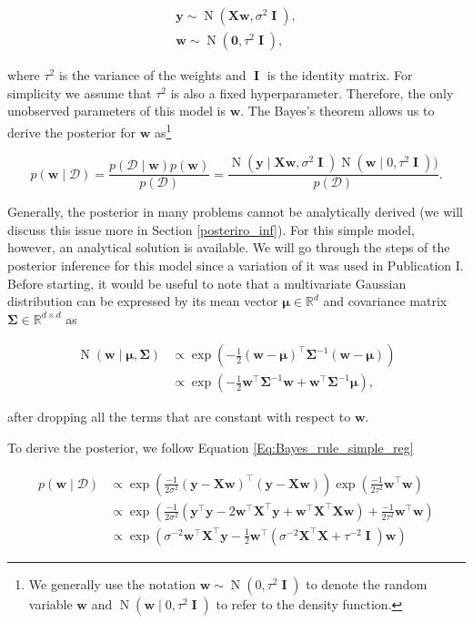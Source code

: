 \documentclass[dissertation,math,vertlayout,pdfa,colorlinks]{aaltoseries}
\newcommand{\bw}{\bm{w}}
\newcommand{\bX}{\bm{X}}
\newcommand{\by}{\bm{y}}
\newcommand{\bD}{\mathcal{D}}
\DeclareMathOperator{\eye}{\textbf{I}}
\DeclareMathOperator{\normalpdf}{N}
\newcommand{\tp}{^{\top}}
\begin{document}
\begin{align}\label{Eq:simple_Bayesian_regression} 
\by \sim \normalpdf(\bX\bw,\sigma^2 \eye),\\
\bw \sim \normalpdf(\textbf{0},\tau^2 \eye), \nonumber
\end{align}

\noindent where $\tau^2$ is the variance of the weights and $\eye$ is the identity matrix. For simplicity we assume that $\tau^2$ is also a fixed hyperparameter. Therefore, the only unobserved parameters of this model is $\bw$. The Bayes's theorem allows us to derive the posterior for $\bw$ as\footnote{We generally use the notation $\bw \sim \normalpdf(0,\tau^2 \eye)$ to denote the random variable $\bw$ and $\normalpdf(\bw\mid 0,\tau^2 \eye)$ to refer to the density function.}

\begin{equation}\label{Eq:Bayes_rule_simple_reg}
p(\bw \mid \bD) = \frac{p(\bD \mid \bw)p(\bw)}{p(\bD)} = \frac{\normalpdf(\by \mid \bX \bw,\sigma^2 \eye) \normalpdf(\bw \mid 0,\tau^2 \eye))}{p(\bD)}.
\end{equation}  

Generally, the posterior in many problems cannot be analytically derived (we will discuss this issue more in Section \ref{posteriro_inf}). For this simple model, however, an analytical solution is available. We will go through the steps of the posterior inference for this model since a variation of it was used in Publication I. Before starting, it would be useful to note that a multivariate Gaussian distribution can be expressed by its mean vector $\bm{\mu}\in \mathbb{R}^d$ and covariance matrix $\bm{\Sigma}\in \mathbb{R}^{d \times d}$ as  

\begin{align}\label{Eq:multi_Gauss}
\normalpdf(\bw \mid \bm{\mu},\bm{\Sigma}) &\propto \exp \left (-\frac{1}{2}(\bw - \bm{\mu})\tp\bm{\Sigma}^{-1}(\bw - \bm{\mu}) \right) \nonumber\\
&\propto \exp \left ( -\frac{1}{2}\bw\tp\bm{\Sigma}^{-1}\bw +  \bw\tp\bm{\Sigma}^{-1}\bm{\mu} \right),
\end{align}

\noindent after dropping all the terms that are constant with respect to $\bw$. 

To derive the posterior, we follow Equation \ref{Eq:Bayes_rule_simple_reg} 

\begin{align} \label{Eq:lin_rel_simple_derivation}
p(\bw \mid \bD) &\propto \exp \left(\frac{-1}{2\sigma^2} (\by - \bX \bw)\tp(\by - \bX \bw)\right) \exp(\frac{-1}{2\tau^2}\bw\tp\bw) \nonumber\\ 
&\propto \exp \left (\frac{-1}{2\sigma^2}(\by\tp\by - 2\bw\tp\bX\tp\by + \bw\tp\bX\tp\bX\bw)+ \frac{-1}{2\tau^2}\bw\tp\bw \right) \nonumber\\
&\propto \exp \left ( \sigma^{-2}\bw\tp\bX\tp\by -\frac{1}{2} \bw\tp( \sigma^{-2}\bX\tp\bX + \tau^{-2} \eye )\bw \right) %
\end{align}    
 
\end{document}
